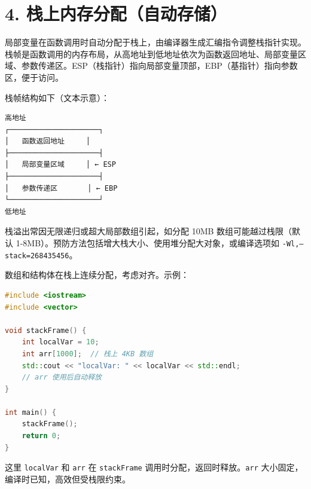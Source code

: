 \chapter{4. 栈上内存分配（自动存储）}
局部变量在函数调用时自动分配于栈上，由编译器生成汇编指令调整栈指针实现。栈帧是函数调用的内存布局，从高地址到低地址依次为函数返回地址、局部变量区域、参数传递区。ESP（栈指针）指向局部变量顶部，EBP（基指针）指向参数区，便于访问。\par
栈帧结构如下（文本示意）：\par
\begin{lstlisting}
高地址
┌─────────────────────┐
│   函数返回地址     │
├─────────────────────┤
│   局部变量区域     │ ← ESP
├─────────────────────┤
│   参数传递区       │ ← EBP
└─────────────────────┘
低地址
\end{lstlisting}
栈溢出常因无限递归或超大局部数组引起，如分配 10MB 数组可能越过栈限（默认 1-8MB）。预防方法包括增大栈大小、使用堆分配大对象，或编译选项如 \texttt{-Wl,--stack=268435456}。\par
数组和结构体在栈上连续分配，考虑对齐。示例：\par
\begin{lstlisting}[language=cpp]
#include <iostream>
#include <vector>

void stackFrame() {
    int localVar = 10;
    int arr[1000];  // 栈上 4KB 数组
    std::cout << "localVar: " << localVar << std::endl;
    // arr 使用后自动释放
}

int main() {
    stackFrame();
    return 0;
}
\end{lstlisting}
这里 \texttt{localVar} 和 \texttt{arr} 在 \texttt{stackFrame} 调用时分配，返回时释放。\texttt{arr} 大小固定，编译时已知，高效但受栈限约束。\par
